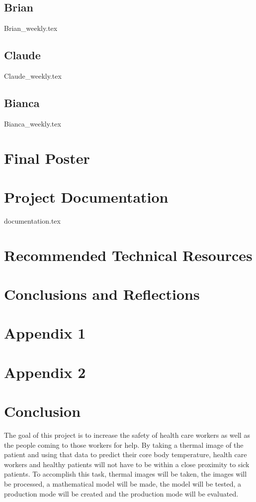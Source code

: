 \documentclass[onecolumn, draftclsnofoot,10pt, compsoc]{IEEEtran}
\begin{document}
		\subsection{Brian}
			{Brian_weekly.tex}
			
		\subsection{Claude}
			{Claude_weekly.tex}
			
		\subsection{Bianca}
			{Bianca_weekly.tex}
		
	\section{Final Poster}
		
	
	\section{Project Documentation}
		{documentation.tex}
	
	\section{Recommended Technical Resources}
	
	\section{Conclusions and Reflections}
	\section{Appendix 1}
	\section{Appendix 2}
	
	
	
	
		
	\section{Conclusion}
		
		The goal of this project is to increase the safety of health care workers as well as the people coming to those workers for help. By taking a thermal image of the patient and using that data to predict their core body temperature, health care workers and healthy patients will not have to be within a close proximity to sick patients. To accomplish this task, thermal images will be taken, the images will be processed, a mathematical model will be made, the model will be tested, a production mode will be created and the production mode will be evaluated. 
		
\end{document}
